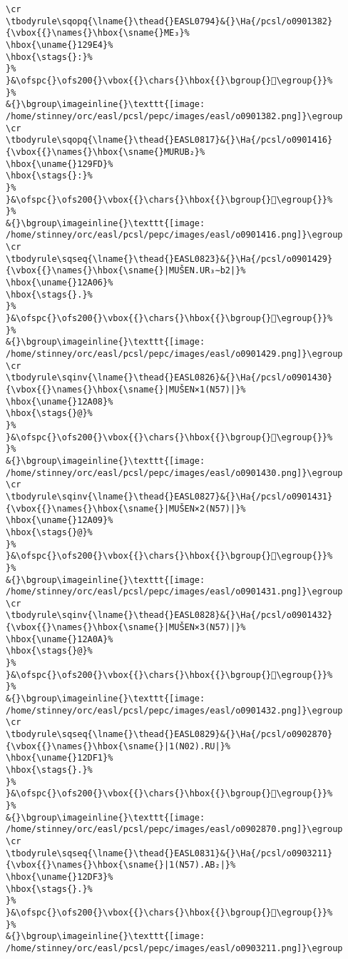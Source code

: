 \begin{verbatim}
\cr
\tbodyrule\sqopq{\lname{}\thead{}EASL0794}&{}\Ha{/pcsl/o0901382}{\vbox{{}\names{}\hbox{\sname{}ME₃}%
\hbox{\uname{}129E4}%
\hbox{\stags{}:}%
}%
}&\ofspc{}\ofs200{}\vbox{{}\chars{}\hbox{{}\bgroup{}𒧤\egroup{}}%
}%
&{}\bgroup\imageinline{}\texttt{[image: /home/stinney/orc/easl/pcsl/pepc/images/easl/o0901382.png]}\egroup
\cr
\tbodyrule\sqopq{\lname{}\thead{}EASL0817}&{}\Ha{/pcsl/o0901416}{\vbox{{}\names{}\hbox{\sname{}MURUB₂}%
\hbox{\uname{}129FD}%
\hbox{\stags{}:}%
}%
}&\ofspc{}\ofs200{}\vbox{{}\chars{}\hbox{{}\bgroup{}𒧽\egroup{}}%
}%
&{}\bgroup\imageinline{}\texttt{[image: /home/stinney/orc/easl/pcsl/pepc/images/easl/o0901416.png]}\egroup
\cr
\tbodyrule\sqseq{\lname{}\thead{}EASL0823}&{}\Ha{/pcsl/o0901429}{\vbox{{}\names{}\hbox{\sname{}|MUŠEN.UR₃∼b2|}%
\hbox{\uname{}12A06}%
\hbox{\stags{}.}%
}%
}&\ofspc{}\ofs200{}\vbox{{}\chars{}\hbox{{}\bgroup{}𒨆\egroup{}}%
}%
&{}\bgroup\imageinline{}\texttt{[image: /home/stinney/orc/easl/pcsl/pepc/images/easl/o0901429.png]}\egroup
\cr
\tbodyrule\sqinv{\lname{}\thead{}EASL0826}&{}\Ha{/pcsl/o0901430}{\vbox{{}\names{}\hbox{\sname{}|MUŠEN×1(N57)|}%
\hbox{\uname{}12A08}%
\hbox{\stags{}@}%
}%
}&\ofspc{}\ofs200{}\vbox{{}\chars{}\hbox{{}\bgroup{}𒨈\egroup{}}%
}%
&{}\bgroup\imageinline{}\texttt{[image: /home/stinney/orc/easl/pcsl/pepc/images/easl/o0901430.png]}\egroup
\cr
\tbodyrule\sqinv{\lname{}\thead{}EASL0827}&{}\Ha{/pcsl/o0901431}{\vbox{{}\names{}\hbox{\sname{}|MUŠEN×2(N57)|}%
\hbox{\uname{}12A09}%
\hbox{\stags{}@}%
}%
}&\ofspc{}\ofs200{}\vbox{{}\chars{}\hbox{{}\bgroup{}𒨉\egroup{}}%
}%
&{}\bgroup\imageinline{}\texttt{[image: /home/stinney/orc/easl/pcsl/pepc/images/easl/o0901431.png]}\egroup
\cr
\tbodyrule\sqinv{\lname{}\thead{}EASL0828}&{}\Ha{/pcsl/o0901432}{\vbox{{}\names{}\hbox{\sname{}|MUŠEN×3(N57)|}%
\hbox{\uname{}12A0A}%
\hbox{\stags{}@}%
}%
}&\ofspc{}\ofs200{}\vbox{{}\chars{}\hbox{{}\bgroup{}𒨊\egroup{}}%
}%
&{}\bgroup\imageinline{}\texttt{[image: /home/stinney/orc/easl/pcsl/pepc/images/easl/o0901432.png]}\egroup
\cr
\tbodyrule\sqseq{\lname{}\thead{}EASL0829}&{}\Ha{/pcsl/o0902870}{\vbox{{}\names{}\hbox{\sname{}|1(N02).RU|}%
\hbox{\uname{}12DF1}%
\hbox{\stags{}.}%
}%
}&\ofspc{}\ofs200{}\vbox{{}\chars{}\hbox{{}\bgroup{}𒷱\egroup{}}%
}%
&{}\bgroup\imageinline{}\texttt{[image: /home/stinney/orc/easl/pcsl/pepc/images/easl/o0902870.png]}\egroup
\cr
\tbodyrule\sqseq{\lname{}\thead{}EASL0831}&{}\Ha{/pcsl/o0903211}{\vbox{{}\names{}\hbox{\sname{}|1(N57).AB₂|}%
\hbox{\uname{}12DF3}%
\hbox{\stags{}.}%
}%
}&\ofspc{}\ofs200{}\vbox{{}\chars{}\hbox{{}\bgroup{}𒷳\egroup{}}%
}%
&{}\bgroup\imageinline{}\texttt{[image: /home/stinney/orc/easl/pcsl/pepc/images/easl/o0903211.png]}\egroup

\end{verbatim}

